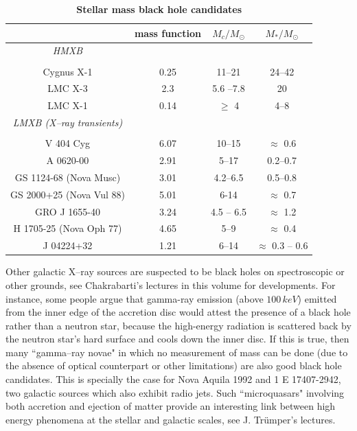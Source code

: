 \documentclass[12pt]{article}
\begin{document}
\begin{table}
\caption{\label{luminet:B}
{\bf Stellar mass black hole candidates}}
\begin{center}
\begin{tabular}{|c|c|c|c|}
\hline
      & mass function & $M_{c}/M_{\odot}$ & $M_{*}/M_{\odot}$     \\ \hline
{\it HMXB}  &      &  &      \\
            &      &  &      \\
 Cygnus X-1     & 0.25      &  11--21 &  24--42  \\
LMC X-3  & 2.3 & 5.6 --7.8 &  20  \\
LMC X-1      &0.14  & $\geq$ 4 &  4--8 \\ \hline
{\it LMXB (X--ray transients)}      &  &   &  \\
            &      &  &      \\
            V 404 Cyg      & 6.07  & 10--15 & $\approx$ 0.6  \\ 
A 0620-00      & 2.91  &  5--17 &  0.2--0.7 \\
GS 1124-68 (Nova Musc)      & 3.01  &  4.2--6.5 &  0.5--0.8  \\
GS 2000+25 (Nova Vul 88)  & 5.01 &  6-14 & $\approx$ 0.7  \\
   GRO J 1655-40   & 3.24& 4.5 -- 6.5 & $\approx$ 1.2\\
  H 1705-25 (Nova Oph 77)    & 4.65 &  5--9 &  $\approx$ 0.4\\
J 04224+32      & 1.21  & 6--14 & $\approx$ 0.3 -- 0.6  \\
\hline
\end{tabular}
\end{center}
\end{table}

Other galactic X--ray sources are suspected to be black holes on 
spectroscopic or other grounds, see Chakrabarti's lectures in this 
volume for developments. For instance, some people argue that gamma-ray 
emission (above $100 \, keV$) emitted from the inner edge of the 
accretion disc would attest the presence of a black hole rather than a 
neutron star, because the high-energy radiation is scattered back by the neutron star's hard surface and cools down the 
inner disc. If this is true, then many ``gamma--ray novae" in which no 
measurement of mass can be done (due to the absence of optical 
counterpart or other limitations) are also good black hole 
candidates. This is specially the case for Nova Aquila 1992 and 1 E 
17407-2942, two galactic sources which also exhibit radio jets. Such 
 ``microquasars" involving both accretion and ejection of matter provide an interesting 
 link between high energy phenomena at the stellar and galactic scales, 
 see J. Tr\"umper's lectures.
 
\end{document}
